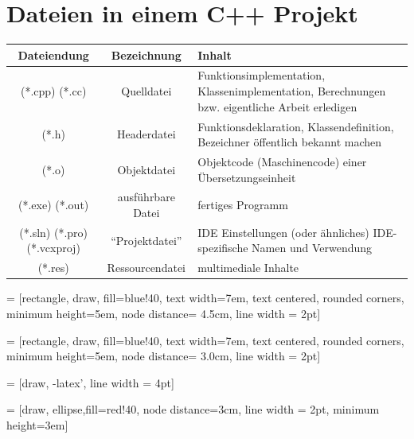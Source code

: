 \documentclass[a4paper]{report}
\begin{document}
\section{Dateien in einem C++ Projekt}
\begin{center}
\begin{tabular}{|c|c|p{8.5cm}|}
	\hline
	Dateiendung & Bezeichnung & Inhalt \\
	\hline
	(*.cpp) (*.cc) & Quelldatei & Funktionsimplementation, Klassenimplementation, \newline Berechnungen bzw. eigentliche Arbeit erledigen \\ \hline
	(*.h) & Headerdatei & Funktionsdeklaration, Klassendefinition, \newline Bezeichner öffentlich bekannt machen \\
	\hline
	(*.o) & Objektdatei & Objektcode (Maschinencode) einer Übersetzungseinheit\\
	\hline
	(*.exe) (*.out) & ausführbare Datei & fertiges Programm \\
	\hline \hline
	(*.sln) (*.pro) (*.vcxproj) & "`Projektdatei"' & IDE Einstellungen (oder ähnliches) \newline IDE-spezifische Namen und Verwendung\\
	\hline \hline
	(*.res) & Ressourcendatei & multimediale Inhalte\\
	\hline
\end{tabular}

\vspace{4ex}

 = [rectangle, draw, fill=blue!40, 
text width=7em, text centered, rounded corners, minimum height=5em, node distance= 4.5cm, line width = 2pt]


 = [rectangle, draw, fill=blue!40, 
text width=7em, text centered, rounded corners, minimum height=5em, node distance= 3.0cm, line width = 2pt]


 = [draw, -latex', line width = 4pt]


 = [draw, ellipse,fill=red!40, node distance=3cm, line width = 2pt,
minimum height=3em]

{\large

}
\end{center}
\end{document}
